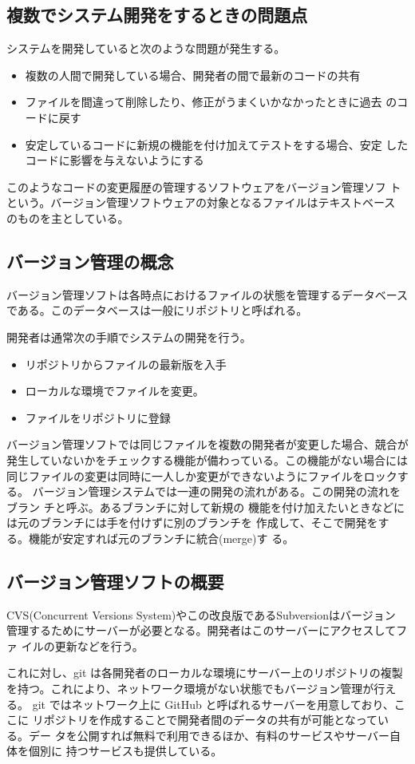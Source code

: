 \subsection{複数でシステム開発をするときの問題点}
システムを開発していると次のような問題が発生する。
\begin{itemize}
 \item 複数の人間で開発している場合、開発者の間で最新のコードの共有
 \item ファイルを間違って削除したり、修正がうまくいかなかったときに過去
       のコードに戻す
 \item 安定しているコードに新規の機能を付け加えてテストをする場合、安定
       したコードに影響を与えないようにする
\end{itemize}
このようなコードの変更履歴の管理するソフトウェアをバージョン管理ソフ
トという。バージョン管理ソフトウェアの対象となるファイルはテキストベース
のものを主としている。
\subsection{バージョン管理の概念}
バージョン管理ソフトは各時点におけるファイルの状態を管理するデータベース
である。このデータベースは一般にリポジトリと呼ばれる。

開発者は通常次の手順でシステムの開発を行う。
\begin{itemize}
 \item リポジトリからファイルの最新版を入手
 \item ローカルな環境でファイルを変更。
 \item ファイルをリポジトリに登録
\end{itemize}
バージョン管理ソフトでは同じファイルを複数の開発者が変更した場合、競合が
発生していないかをチェックする機能が備わっている。この機能がない場合には
同じファイルの変更は同時に一人しか変更ができないようにファイルをロックす
る。
バージョン管理システムでは一連の開発の流れがある。この開発の流れをブラン
チと呼ぶ。あるブランチに対して新規の
機能を付け加えたいときなどには元のブランチには手を付けずに別のブランチを
作成して、そこで開発をする。機能が安定すれば元のブランチに統合(merge)す
る。
\subsection{バージョン管理ソフトの概要}
CVS(Concurrent Versions System)やこの改良版であるSubversionはバージョン
管理するためにサーバーが必要となる。開発者はこのサーバーにアクセスしてファ
イルの更新などを行う。

これに対し、git は各開発者のローカルな環境にサーバー上のリポジトリの複製
を持つ。これにより、ネットワーク環境がない状態でもバージョン管理が行える。
git ではネットワーク上に GitHub と呼ばれるサーバーを用意しており、ここに
リポジトリを作成することで開発者間のデータの共有が可能となっている。デー
タを公開すれば無料で利用できるほか、有料のサービスやサーバー自体を個別に
持つサービスも提供している。

